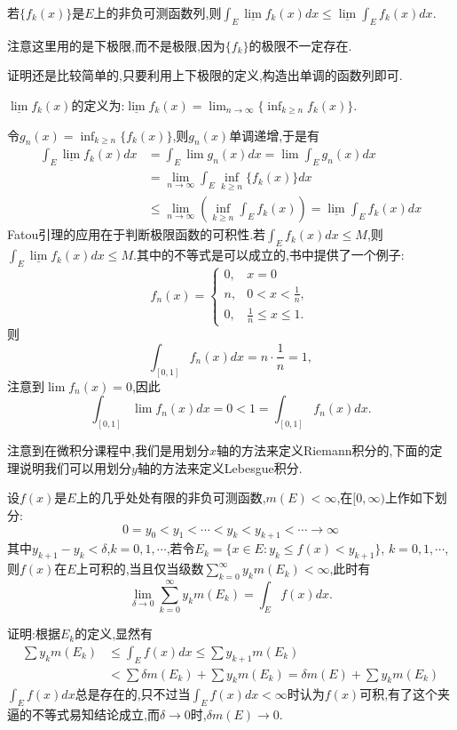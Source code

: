 \documentclass[12pt,a4paper,openany]{book}
\begin{document}
若$\{f_k(x)\}$是$E$上的非负可测函数列,则$\int_{E}{\underline{\lim}{f_k(x)dx}} \le \underline{\lim}{\int_{E}{f_k(x)dx}}$.

注意这里用的是下极限,而不是极限,因为$\{f_k\}$的极限不一定存在.

证明还是比较简单的,只要利用上下极限的定义,构造出单调的函数列即可.

$\underline{\lim}{f_k(x)}$的定义为:$\underline{\lim}{f_k(x)} = \lim_{n \rightarrow \infty}{\{\inf_{k \ge n}{f_k(x)}\}}$.

令$g_n(x) = \inf_{k \ge n}\{f_k(x)\}$,则$g_n(x)$单调递增,于是有
\[
\begin{aligned}
\int_{E}{\underline{\lim}{f_k(x)dx}}&=\int_{E}{\lim{g_n(x)}dx} = \lim{\int_{E}{g_n(x)dx}} \\
&=\lim_{n \rightarrow \infty}{\int_{E}{\inf_{k \ge n}\{f_k(x)\}dx}} \\
&\le \lim_{n \rightarrow \infty}{(\inf_{k \ge n}{\int_{E}{f_k(x)}})} = \underline{\lim}{\int_{E}{f_k(x)dx}}
\end{aligned}
\]
Fatou引理的应用在于判断极限函数的可积性.若$\int_{E}{f_k(x)dx} \le M$,则$\int_{E}{\underline{\lim}{f_k(x)}dx} \le M$.其中的不等式是可以成立的,书中提供了一个例子:
\[
f_n(x)=\begin{cases}
0, &x=0 \\
n, &0<x<\frac{1}{n},\\
0, &\frac{1}{n} \le x \le 1.
\end{cases}
\]
则
\[
\int_{[0,1]}{f_n(x)dx} = n \cdot \frac{1}{n} = 1,
\]
注意到$\lim{f_n(x)} = 0$,因此
\[
\int_{[0,1]}{\lim{f_n(x)}dx} = 0 < 1 = \int_{[0,1]}{f_n(x)dx}.
\]

注意到在微积分课程中,我们是用划分$x$轴的方法来定义Riemann积分的,下面的定理说明我们可以用划分$y$轴的方法来定义Lebesgue积分.

设$f(x)$是$E$上的几乎处处有限的非负可测函数,$m(E)<\infty$,在$[0,\infty)$上作如下划分:
\[
0 = y_0 < y_1 < \cdots < y_k < y_{k+1} < \cdots \rightarrow \infty
\]
其中$y_{k+1}-y_k < \delta$,$k=0,1,\cdots$,若令$E_k = \{x \in E: y_k \le f(x) < y_{k+1}\}$, $k=0,1,\cdots$,则$f(x)$在$E$上可积的,当且仅当级数$\sum_{k=0}^{\infty}{y_km(E_k)}<\infty$,此时有
\[
\lim_{\delta \rightarrow 0}{\sum_{k=0}^{\infty}{y_km(E_k)}} = \int_{E}{f(x)dx}.
\]

证明:根据$E_k$的定义,显然有
\[
\begin{aligned}
\sum{y_km(E_k)} &\le \int_{E}{f(x)dx} \le \sum{y_{k+1}m(E_k)} \\
&< \sum{\delta{}m(E_k)} + \sum{y_km(E_k)} = \delta{}m(E) + \sum{y_km(E_k)}
\end{aligned}
\]
$\int_{E}{f(x)dx}$总是存在的,只不过当$\int_{E}{f(x)dx} < \infty$时认为$f(x)$可积,有了这个夹逼的不等式易知结论成立,而$\delta \rightarrow 0$时,$\delta{}m(E) \rightarrow 0$.
\end{document}
